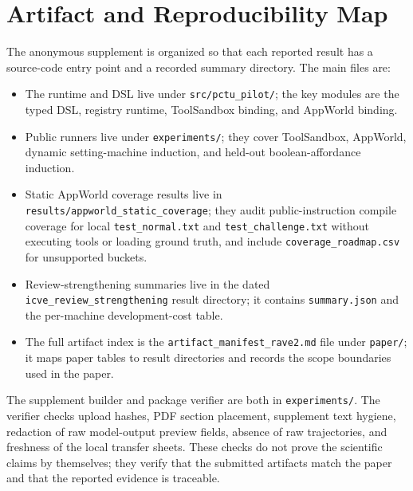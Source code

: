 \documentclass[11pt]{article}
\begin{document}
\clearpage
\section{Artifact and Reproducibility Map}
\label{app:artifact-map}

The anonymous supplement is organized so that each reported result has a source-code
entry point and a recorded summary directory. The main files are:
\begin{itemize}[leftmargin=*]
\item The runtime and DSL live under \texttt{src/pctu\_pilot/}; the key modules are the
typed DSL, registry runtime, ToolSandbox binding, and AppWorld binding.
\item Public runners live under \texttt{experiments/}; they cover ToolSandbox, AppWorld,
dynamic setting-machine induction, and held-out boolean-affordance induction.
\item Static AppWorld coverage results live in \texttt{results/appworld\_static\_coverage};
they audit public-instruction compile coverage for local \texttt{test\_normal.txt} and
\texttt{test\_challenge.txt} without executing tools or loading ground truth, and include
\texttt{coverage\_roadmap.csv} for unsupported buckets.
\item Review-strengthening summaries live in the dated \texttt{icve\_review\_strengthening}
result directory; it contains \texttt{summary.json} and the per-machine development-cost
table.
\item The full artifact index is the \texttt{artifact\_manifest\_rave2.md} file under
\texttt{paper/}; it maps paper tables to result directories and records the scope
boundaries used in the paper.
\end{itemize}

The supplement builder and package verifier are both in \texttt{experiments/}. The
verifier checks upload hashes, PDF section placement, supplement text hygiene, redaction
of raw model-output preview fields, absence of raw trajectories, and freshness of the
local transfer sheets. These checks do not prove the scientific claims by themselves;
they verify that the submitted artifacts match the paper and that the reported evidence
is traceable.
\end{document}
